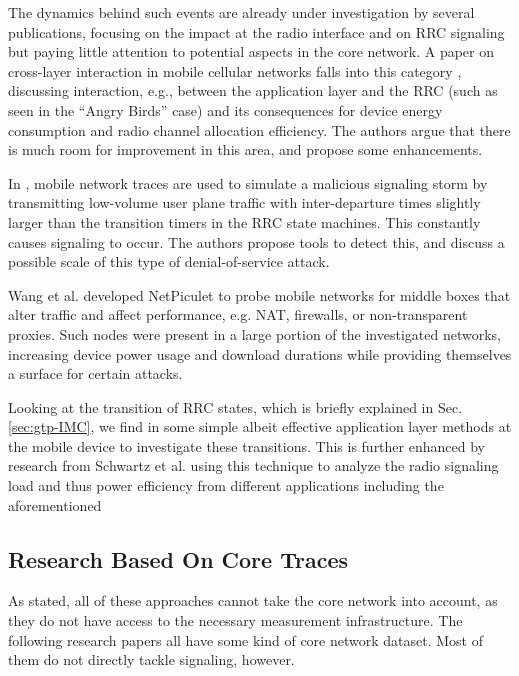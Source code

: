 The dynamics behind such events are already under investigation by several publications, focusing on the impact at the radio interface and on \ac{RRC} signaling but paying little attention to potential aspects in the core network. A paper on cross-layer interaction in mobile cellular networks falls into this category \cite{qian2011profiling}, discussing interaction, e.g., between the application layer and the \ac{RRC} (such as seen in the ``Angry Birds'' case) and its consequences for device energy consumption and radio channel allocation efficiency. The authors argue that there is much room for improvement in this area, and propose some enhancements.

In \cite{lee2007detection}, mobile network traces are used to simulate a malicious signaling storm by transmitting low-volume user plane traffic with inter-departure times slightly larger than the transition timers in the \ac{RRC} state machines. This constantly causes signaling to occur. The authors propose tools to detect this, and discuss a possible scale of this type of denial-of-service attack.
 
Wang et al.\cite{wang2011untold} developed NetPiculet to probe mobile networks for middle boxes that alter traffic and affect performance, e.g. NAT, firewalls, or non-transparent proxies. Such nodes were present in a large portion of the investigated networks, increasing device power usage and download durations while providing themselves a surface for certain attacks.

Looking at the transition of \ac{RRC} states, which is briefly explained in Sec. \ref{sec:gtp-IMC}, we find in \cite{5360763} some simple albeit effective application layer methods at the mobile device to investigate these transitions. This is further enhanced by research from Schwartz et al.\cite{schwartz2013angrybirds} using this technique to analyze the radio signaling load and thus power efficiency from different applications including the aforementioned


\subsection{Research Based On Core Traces}

As stated, all of these approaches cannot take the core network into account, as they do not have access to the necessary measurement infrastructure. The following research papers all have some kind of core network dataset. Most of them do not directly tackle signaling, however.

